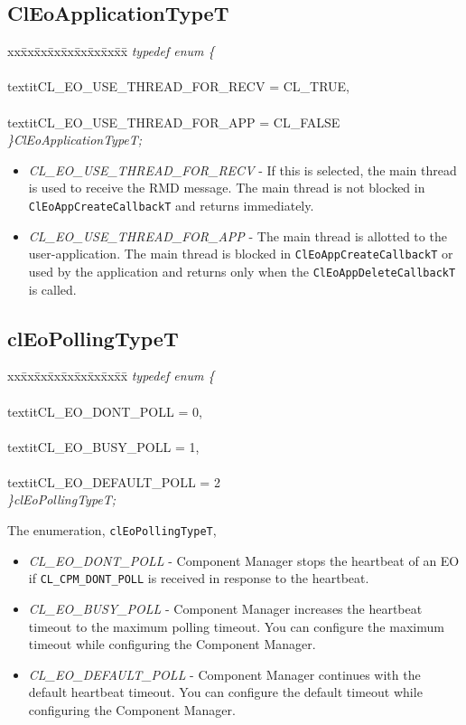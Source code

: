 \begin{flushleft}
\subsection{ClEoApplicationTypeT}
\begin{tabbing}
xx\=xx\=xx\=xx\=xx\=xx\=xx\=xx\=xx\=\kill
\textit{typedef enum \{}\\
\>\>\>\\textit{CL\_EO\_USE\_THREAD\_FOR\_RECV   = CL\_TRUE,}\\
\>\>\>\\textit{CL\_EO\_USE\_THREAD\_FOR\_APP    = CL\_FALSE}\\
\textit{\}ClEoApplicationTypeT;}\end{tabbing}
\begin{itemize}
 \item
 \textit{CL\_\-EO\_\-USE\_\-THREAD\_\-FOR\_\-RECV} - If this is selected, the main thread is used to receive the RMD message. 
 The main thread is not blocked in {\tt{ClEoAppCreateCallbackT}} and returns immediately. 
 \item
 \textit{CL\_\-EO\_\-USE\_\-THREAD\_\-FOR\_\-APP} - The main thread is allotted to the user-application. The main
 thread is blocked in {\tt{ClEoAppCreateCallbackT}} or used by the
 application and returns only when the {\tt{ClEoAppDeleteCallbackT}} is called.
 \end{itemize}

 
\subsection{clEoPollingTypeT}
\begin{tabbing}
xx\=xx\=xx\=xx\=xx\=xx\=xx\=xx\=xx\=\kill
\textit{typedef enum \{}\\
\>\>\>\\textit{CL\_EO\_DONT\_POLL    = 0,}\\
\>\>\>\\textit{CL\_EO\_BUSY\_POLL    = 1,}\\
\>\>\>\\textit{CL\_EO\_DEFAULT\_POLL = 2}\\
\textit{\}clEoPollingTypeT;}\end{tabbing}
The enumeration, {\tt{clEoPollingTypeT}}, 
\begin{itemize}
 \item
 \textit{CL\_\-EO\_\-DONT\_\-POLL} - Component Manager stops the heartbeat of an EO
 if {\tt{CL\_\-CPM\_\-DONT\_\-POLL}} is received in response to the heartbeat.
\item
 \textit{CL\_\-EO\_\-BUSY\_\-POLL} - Component Manager increases the heartbeat timeout to the maximum polling timeout. You can configure the maximum
 timeout  while configuring the Component Manager.
 \item
 \textit{CL\_\-EO\_\-DEFAULT\_\-POLL} - Component Manager continues with the default heartbeat timeout. You can configure the default timeout 
 while configuring the Component Manager.
  \end{itemize}



\end{flushleft}
